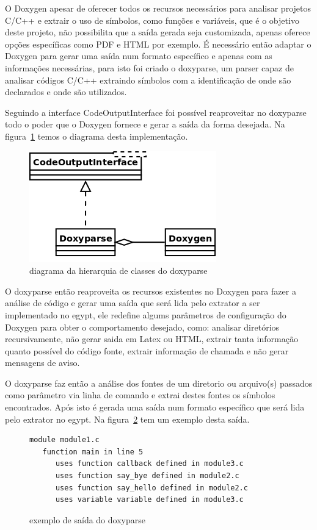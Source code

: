 O Doxygen apesar de oferecer todos os recursos necessários para
analisar projetos C/C++ e extrair o uso de símbolos, como funções e variáveis,
que é o objetivo deste projeto, não possibilita que a saída gerada seja
customizada, apenas oferece opções específicas como PDF e HTML por exemplo. É
necessário então adaptar o Doxygen para gerar uma saída num formato
específico e apenas com as informações necessárias, para isto foi criado o
doxyparse, um parser capaz de analisar códigos C/C++ extraindo símbolos
com a identificação de onde são declarados e onde são utilizados.

Seguindo a interface CodeOutputInterface foi possível reaproveitar no doxyparse
todo o poder que o Doxygen fornece e gerar a saída da forma desejada. Na
figura~\ref{doxyparse-diagram} temos o diagrama desta implementação.

\begin{figure}[h]
\center
\includegraphics[scale=0.5]{imagens/doxyparse-diagram}
\caption{diagrama da hierarquia de classes do doxyparse}
\label{doxyparse-diagram}
\end{figure}

O doxyparse então reaproveita os recursos existentes no Doxygen para fazer a
análise de código e gerar uma saída que será lida pelo extrator a ser
implementado no egypt, ele redefine algums parâmetros de configuração
do Doxygen para obter o comportamento desejado, como: analisar diretórios
recursivamente, não gerar saida em Latex ou HTML, extrair tanta informação
quanto possível do código fonte, extrair informação de chamada e não gerar
mensagens de aviso.

O doxyparse faz então a análise dos fontes de um diretorio ou arquivo(s)
passados como parâmetro via linha de comando e extrai destes fontes os símbolos
encontrados. Após isto é gerada uma saída num formato específico que será lida
pelo extrator no egypt. Na figura~\ref{exemplo-saida-doxyparse} tem um exemplo
desta saída.

\begin{figure}[h]
\begin{Verbatim}[frame=single,fontsize=\relsize{-2},fontfamily=courier]
module module1.c
   function main in line 5
      uses function callback defined in module3.c
      uses function say_bye defined in module2.c
      uses function say_hello defined in module2.c
      uses variable variable defined in module3.c
\end{Verbatim}
\caption{exemplo de saída do doxyparse}
\label{exemplo-saida-doxyparse}
\end{figure}

